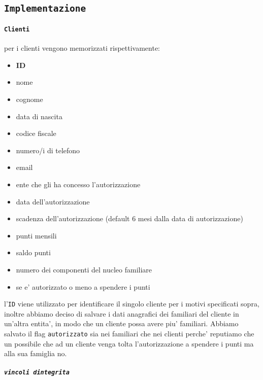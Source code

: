 \documentclass[]{article}
\providecommand{\tightlist}{%
  \setlength{\itemsep}{0pt}\setlength{\parskip}{0pt}}
\let\oldparagraph\paragraph
\renewcommand{\paragraph}[1]{\oldparagraph{#1}\mbox{}}
\let\oldsubparagraph\subparagraph
\renewcommand{\subparagraph}[1]{\oldsubparagraph{#1}\mbox{}}
\begin{document}
\hypertarget{implementazione}{%
\subsection{\texorpdfstring{\texttt{Implementazione}}{Implementazione}}\label{implementazione}}

\hypertarget{clienti}{%
\paragraph{\texorpdfstring{\texttt{Clienti}}{Clienti}}\label{clienti}}

per i clienti vengono memorizzati rispettivamente:

\begin{itemize}
\tightlist
\item
  \textbf{ID}
\item
  nome
\item
  cognome
\item
  data di nascita
\item
  codice fiscale
\item
  numero/i di telefono
\item
  email
\item
  ente che gli ha concesso l'autorizzazione
\item
  data dell'autorizzazione
\item
  scadenza dell'autorizzazione (default 6 mesi dalla data di
  autorizzazione)
\item
  punti mensili
\item
  saldo punti
\item
  numero dei componenti del nucleo familiare
\item
  se e' autorizzato o meno a spendere i punti
\end{itemize}

l'\texttt{ID} viene utilizzato per identificare il singolo cliente per i
motivi specificati sopra, inoltre abbiamo deciso di salvare i dati
anagrafici dei familiari del cliente in un'altra entita', in modo che un
cliente possa avere piu' familiari. Abbiamo salvato il flag
\texttt{\textquotesingle{}autorizzato\textquotesingle{}} sia nei
familiari che nei clienti perche' reputiamo che un possibile che ad un
cliente venga tolta l'autorizzazione a spendere i punti ma alla sua
famiglia no.

\hypertarget{vincoli-dintegrita}{%
\subparagraph{\texorpdfstring{\texttt{vincoli\ d\textquotesingle{}integrita\textquotesingle{}}}{vincoli d'integrita'}}\label{vincoli-dintegrita}}
\end{document}
